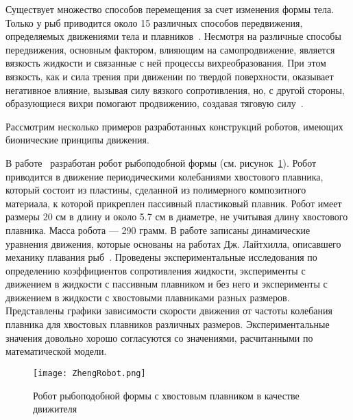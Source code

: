 Существует множество способов перемещения за счет изменения формы тела. Только у рыб приводится около 15 различных способов передвижения, определяемых движениями тела и плавников~\cite{Blake_1983}. Несмотря на различные способы передвижения, основным фактором, влияющим на самопродвижение, является вязкость жидкости и связанные с ней процессы вихреобразования. При этом вязкость, как и сила трения при движении по твердой поверхности, оказывает негативное влияние, вызывая силу вязкого сопротивления, но, с другой стороны, образующиеся вихри помогают продвижению, создавая тяговую силу~\cite{Vetchanin_Kilin_2016}.

Рассмотрим несколько примеров разработанных конструкций роботов, имеющих бионические принципы движения.

В работе~\cite{Zheng_2010} разработан робот рыбоподобной формы (см. рисунок~\ref{ZhengRobot}). Робот приводится в движение периодическими колебаниями хвостового плавника, который состоит из пластины, сделанной из полимерного композитного материала, к которой прикреплен пассивный пластиковый плавник. Робот имеет размеры 20 см в длину и около 5.7 см в диаметре, не учитывая длину хвостового плавника. Масса робота --- 290 грамм. В работе записаны динамические уравнения движения, которые основаны на работах Дж. Лайтхилла, описавшего механику плавания рыб~\cite{Lighthill_1970}. Проведены экспериментальные исследования по определению коэффициентов сопротивления жидкости, эксперименты с движением в жидкости с пассивным плавником и без него и эксперименты с движением в жидкости с хвостовыми плавниками разных размеров. Представлены графики зависимости скорости движения от частоты колебания плавника для хвостовых плавников различных размеров. Экспериментальные значения довольно хорошо согласуются со значениями, расчитанными по математической модели.

\begin{figure}[h]
	\centering
	\texttt{[image: ZhengRobot.png]}%
	\caption{Робот рыбоподобной формы с хвостовым плавником в качестве движителя}
	\label{ZhengRobot}
\end{figure}

